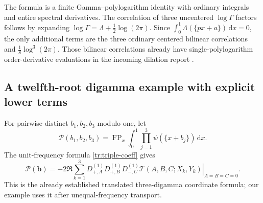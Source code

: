 \documentclass[11pt,a4paper]{article}
\numberwithin{equation}{section}
\theoremstyle{definition}
\theoremstyle{remark}
\DeclareMathOperator{\FP}{FP}
\newcommand{\dd}{\,\mathrm d}
\begin{document}
The formula is a finite Gamma--polylogarithm identity with ordinary
integrals and entire spectral derivatives. The correlation of three
uncentered $\log\Gamma$ factors follows by expanding
$\log\Gamma=\Lambda+\tfrac12\log(2\pi)$. Since
$\int_0^1\Lambda(\{px+a\})\dd x=0$, the only additional terms are
the three ordinary centered bilinear correlations and
$\tfrac18\log^3(2\pi)$. Those bilinear correlations already have
single-polylogarithm order-derivative evaluations in the incoming
dilation report \cite{incoming-sh}.

\subsection{A twelfth-root digamma example with explicit lower terms}
For pairwise distinct $b_1,b_2,b_3$ modulo one, let
\[
 \mathcal P(b_1,b_2,b_3)
  =\FP_x\int_0^1\prod_{j=1}^3\psi(\{x+b_j\})\dd x.
\]
The unit-frequency formula \eqref{tr:triple-coeff} gives
\begin{equation}\label{tc:unit-digamma}
 \mathcal P(\boldsymbol b)
  =-2\Re\sum_{k=1}^3
    \left.
      D_{+,A}^{(1)}D_{+,B}^{(1)}D_{-,C}^{(1)}
        \mathcal T(A,B,C;X_k,Y_k)
    \right|_{A=B=C=0}.
\end{equation}
This is the already established translated three-digamma coordinate
formula; our example uses it after unequal-frequency transport.
\end{document}
